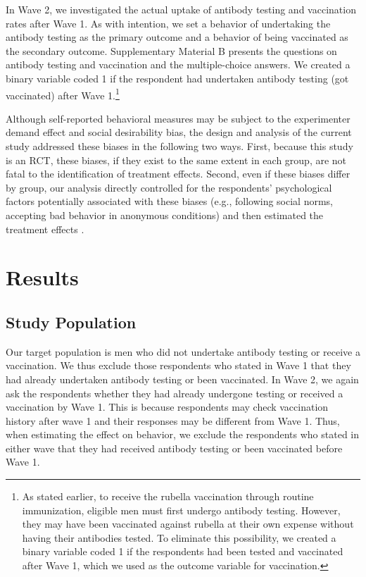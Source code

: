 \documentclass[
      12pt,
    a4paper
]{article}
\begin{document}
In Wave 2, we investigated the actual uptake of antibody testing and vaccination rates after Wave 1. As with intention, we set a behavior of undertaking the antibody testing as the primary outcome and a behavior of being vaccinated as the secondary outcome. Supplementary Material B presents the questions on antibody testing and vaccination and the multiple-choice answers. We created a binary variable coded 1 if the respondent had undertaken antibody testing (got vaccinated) after Wave 1.\footnote{As stated earlier, to receive the rubella vaccination through routine immunization, eligible men must first undergo antibody testing. However, they may have been vaccinated against rubella at their own expense without having their antibodies tested. To eliminate this possibility, we created a binary variable coded 1 if the respondents had been tested and vaccinated after Wave 1, which we used as the outcome variable for vaccination.}

Although self-reported behavioral measures may be subject to the experimenter demand effect and social desirability bias, the design and analysis of the current study addressed these biases in the following two ways. First, because this study is an RCT, these biases, if they exist to the same extent in each group, are not fatal to the identification of treatment effects. Second, even if these biases differ by group, our analysis directly controlled for the respondents' psychological factors potentially associated with these biases (e.g., following social norms, accepting bad behavior in anonymous conditions) and then estimated the treatment effects .

\hypertarget{results}{%
\section{Results}\label{results}}

\hypertarget{sample}{%
\subsection{Study Population}\label{sample}}

Our target population is men who did not undertake antibody testing or receive a vaccination. We thus exclude those respondents who stated in Wave 1 that they had already undertaken antibody testing or been vaccinated. In Wave 2, we again ask the respondents whether they had already undergone testing or received a vaccination by Wave 1. This is because respondents may check vaccination history after wave 1 and their responses may be different from Wave 1. Thus, when estimating the effect on behavior, we exclude the respondents who stated in either wave that they had received antibody testing or been vaccinated before Wave 1.
\end{document}
